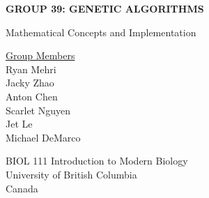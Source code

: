 \documentclass[letterpaper, reqno,11pt]{article}
\begin{document}

\begin{titlepage}
    \begin{center}
        \vspace*{8cm}
 
        \Huge
        \textbf{GROUP 39: GENETIC ALGORITHMS}
        
        \vspace{0.5cm}
        \LARGE
        Mathematical Concepts and Implementation
 
        \vspace{1.5cm}
 
        \vspace{0.5cm}
        \LARGE
 
 
        \vfill
 
       \underline {Group Members}\\
       \vspace{0.5cm}
        Ryan Mehri\\
        Jacky Zhao\\
        Anton Chen\\
        Scarlet Nguyen\\
        Jet Le\\
        Michael DeMarco
 
        \vspace{0.8cm}
 
 
        \Large
        BIOL 111 Introduction to Modern Biology\\
        University of British Columbia\\
        Canada\\
 
    \end{center}
\end{titlepage}







\end{document}
